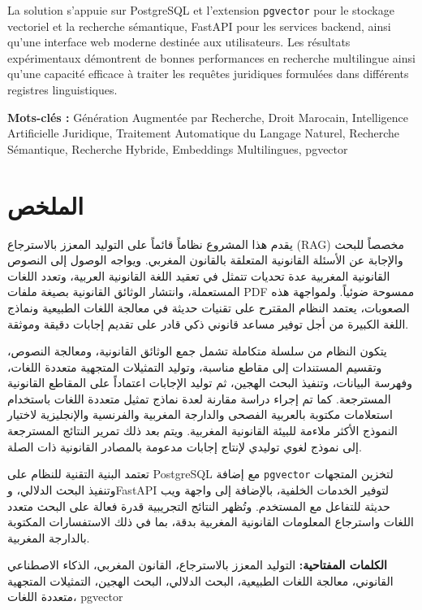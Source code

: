 \documentclass[12pt,a4paper]{report}
\begin{document}
La solution s'appuie sur PostgreSQL et l'extension \texttt{pgvector} pour le stockage vectoriel et la recherche sémantique, FastAPI pour les services backend, ainsi qu'une interface web moderne destinée aux utilisateurs. Les résultats expérimentaux démontrent de bonnes performances en recherche multilingue ainsi qu'une capacité efficace à traiter les requêtes juridiques formulées dans différents registres linguistiques.

\vspace{0.5cm}

\noindent\textbf{Mots-clés :} Génération Augmentée par Recherche, Droit Marocain, Intelligence Artificielle Juridique, Traitement Automatique du Langage Naturel, Recherche Sémantique, Recherche Hybride, Embeddings Multilingues, pgvector

\clearpage

\chapter*{\textarabic{الملخص}}

\begin{Arabic}

يقدم هذا المشروع نظاماً قائماً على التوليد المعزز بالاسترجاع (RAG) مخصصاً للبحث والإجابة عن الأسئلة القانونية المتعلقة بالقانون المغربي. ويواجه الوصول إلى النصوص القانونية المغربية عدة تحديات تتمثل في تعقيد اللغة القانونية العربية، وتعدد اللغات المستعملة، وانتشار الوثائق القانونية بصيغة ملفات PDF ممسوحة ضوئياً. ولمواجهة هذه الصعوبات، يعتمد النظام المقترح على تقنيات حديثة في معالجة اللغات الطبيعية ونماذج اللغة الكبيرة من أجل توفير مساعد قانوني ذكي قادر على تقديم إجابات دقيقة وموثقة.

يتكون النظام من سلسلة متكاملة تشمل جمع الوثائق القانونية، ومعالجة النصوص، وتقسيم المستندات إلى مقاطع مناسبة، وتوليد التمثيلات المتجهية متعددة اللغات، وفهرسة البيانات، وتنفيذ البحث الهجين، ثم توليد الإجابات اعتماداً على المقاطع القانونية المسترجعة. كما تم إجراء دراسة مقارنة لعدة نماذج تمثيل متعددة اللغات باستخدام استعلامات مكتوبة بالعربية الفصحى والدارجة المغربية والفرنسية والإنجليزية لاختيار النموذج الأكثر ملاءمة للبيئة القانونية المغربية. ويتم بعد ذلك تمرير النتائج المسترجعة إلى نموذج لغوي توليدي لإنتاج إجابات مدعومة بالمصادر القانونية ذات الصلة.

تعتمد البنية التقنية للنظام على PostgreSQL مع إضافة \texttt{pgvector} لتخزين المتجهات وتنفيذ البحث الدلالي، وFastAPI لتوفير الخدمات الخلفية، بالإضافة إلى واجهة ويب حديثة للتفاعل مع المستخدم. وتُظهر النتائج التجريبية قدرة فعالة على البحث متعدد اللغات واسترجاع المعلومات القانونية المغربية بدقة، بما في ذلك الاستفسارات المكتوبة بالدارجة المغربية.

\vspace{0.5cm}

\textbf{الكلمات المفتاحية:}
التوليد المعزز بالاسترجاع، القانون المغربي، الذكاء الاصطناعي القانوني، معالجة اللغات الطبيعية، البحث الدلالي، البحث الهجين، التمثيلات المتجهية متعددة اللغات، pgvector

\end{Arabic}
\end{document}

